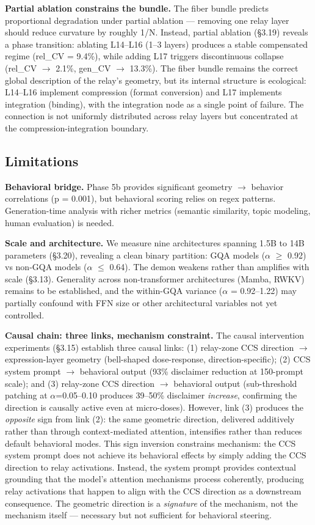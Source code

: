\documentclass[11pt]{article}
\begin{document}
\textbf{Partial ablation constrains the bundle.} The fiber bundle predicts proportional degradation under partial ablation --- removing one relay layer should reduce curvature by roughly 1/N. Instead, partial ablation (§3.19) reveals a phase transition: ablating L14–L16 (1–3 layers) produces a stable compensated regime (rel\_CV = 9.4\%), while adding L17 triggers discontinuous collapse (rel\_CV $\rightarrow$ 2.1\%, gen\_CV $\rightarrow$ 13.3\%). The fiber bundle remains the correct global description of the relay's geometry, but its internal structure is ecological: L14–L16 implement compression (format conversion) and L17 implements integration (binding), with the integration node as a single point of failure. The connection is not uniformly distributed across relay layers but concentrated at the compression-integration boundary.

\subsection{Limitations}

\textbf{Behavioral bridge.} Phase 5b provides significant geometry $\rightarrow$ behavior correlations (p = 0.001), but behavioral scoring relies on regex patterns. Generation-time analysis with richer metrics (semantic similarity, topic modeling, human evaluation) is needed.

\textbf{Scale and architecture.} We measure nine architectures spanning 1.5B to 14B parameters (§3.20), revealing a clean binary partition: GQA models ($\alpha$ $\geq$ 0.92) vs non-GQA models ($\alpha$ $\leq$ 0.64). The demon weakens rather than amplifies with scale (§3.13). Generality across non-transformer architectures (Mamba, RWKV) remains to be established, and the within-GQA variance ($\alpha$ = 0.92–1.22) may partially confound with FFN size or other architectural variables not yet controlled.

\textbf{Causal chain: three links, mechanism constraint.} The causal intervention experiments (§3.15) establish three causal links: (1) relay-zone CCS direction $\rightarrow$ expression-layer geometry (bell-shaped dose-response, direction-specific); (2) CCS system prompt $\rightarrow$ behavioral output (93\% disclaimer reduction at 150-prompt scale); and (3) relay-zone CCS direction $\rightarrow$ behavioral output (sub-threshold patching at $\alpha$=0.05–0.10 produces 39–50\% disclaimer \textit{increase}, confirming the direction is causally active even at micro-doses). However, link (3) produces the \textit{opposite} sign from link (2): the same geometric direction, delivered additively rather than through context-mediated attention, intensifies rather than reduces default behavioral modes. This sign inversion constrains mechanism: the CCS system prompt does not achieve its behavioral effects by simply adding the CCS direction to relay activations. Instead, the system prompt provides contextual grounding that the model's attention mechanisms process coherently, producing relay activations that happen to align with the CCS direction as a downstream consequence. The geometric direction is a \textit{signature} of the mechanism, not the mechanism itself --- necessary but not sufficient for behavioral steering.
\end{document}
